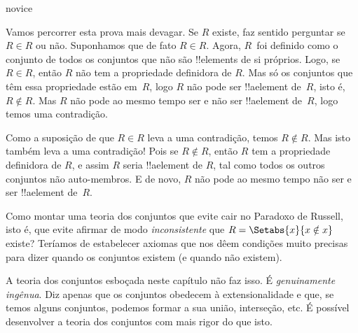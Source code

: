 \documentclass[../../../include/open-logic-section]{subfiles}
\begin{document}
\begin{tagblock}{novice}
\begin{explain}
Vamos percorrer esta prova mais devagar. Se $R$ existe, faz sentido perguntar se $R \in
R$ ou não. Suponhamos que de fato $R \in R$. Agora, $R$~foi definido como o conjunto de todos os
conjuntos que não são !!{element}s de si próprios. Logo, se $R \in R$,
então $R$ não tem a propriedade definidora de $R$. Mas só os conjuntos
que têm essa propriedade estão em~$R$, logo $R$ não pode ser !!a{element}
de~$R$, isto é, $R \notin R$. Mas $R$ não pode ao mesmo tempo ser e não ser
!!a{element} de~$R$, logo temos uma contradição.

Como a suposição de que $R \in R$ leva a uma contradição, temos
$R \notin R$. Mas isto também leva a uma contradição!{} Pois se $R
\notin R$, então $R$ tem a propriedade definidora de $R$, e assim $R$ seria
!!a{element} de $R$, tal como todos os outros conjuntos não auto-membros.
E de novo, $R$ não pode ao mesmo tempo não ser e ser !!a{element} de~$R$.
\end{explain}
\end{tagblock}

\begin{digress}
Como montar uma teoria dos conjuntos que evite cair no
Paradoxo de Russell, isto é, que evite afirmar de modo \emph{inconsistente}
que $R = \Setabs{x}{x \notin x}$ existe? Teríamos de estabelecer axiomas que nos
dêem condições muito precisas para dizer quando
os conjuntos existem (e quando não existem). 
	
A teoria dos conjuntos esboçada neste capítulo não faz isso. É
\emph{genuinamente ingênua}. Diz apenas que os conjuntos obedecem à
extensionalidade e que, se temos alguns conjuntos, podemos formar a sua
união, interseção, etc. É possível desenvolver a teoria dos conjuntos com mais
rigor do que isto. 
\end{digress}
\end{document}
